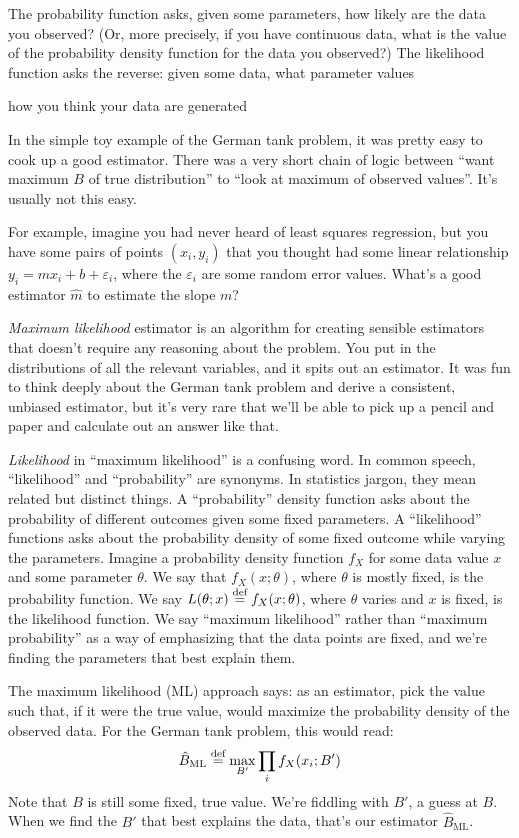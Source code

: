 The probability function asks, given some parameters, how
likely are the data you observed? (Or, more precisely, if you have continuous data,
what is the value of the probability density function for the data you observed?)
The likelihood function asks the reverse: given some data, what parameter values


how you think your
data are generated

In the simple toy example of the German tank problem, it was pretty easy to
cook up a good estimator. There was a very short chain of logic between ``want
maximum $B$ of true distribution'' to ``look at maximum of observed values''.
It's usually not this easy.

For example, imagine you had never heard of least squares regression, but you
have some pairs of points $(x_i, y_i)$ that you thought had some linear
relationship $y_i = m x_i + b + \varepsilon_i$, where the $\varepsilon_i$ are
some random error values. What's a good estimator $\hat{m}$ to estimate the
slope $m$?

\emph{Maximum likelihood} estimator is an algorithm for creating sensible
estimators that doesn't require any reasoning about the problem. You put in
the distributions of all the relevant variables, and it spits out an
estimator. It was fun to think deeply about the German tank problem and
derive a consistent, unbiased estimator, but it's very rare that we'll be
able to pick up a pencil and paper and calculate out an answer like that.

\emph{Likelihood} in ``maximum likelihood'' is a confusing word. In common
speech, ``likelihood'' and ``probability'' are synonyms. In statistics jargon,
they mean related but distinct things. A ``probability'' density function asks
about the probability of different outcomes given some fixed parameters. A
``likelihood'' functions asks about the probability density of some fixed
outcome while varying the parameters. Imagine a probability density function
$f_X$ for some data value $x$ and some parameter $\theta$. We say that $f_X(x;
\theta)$, where $\theta$ is mostly fixed, is the probability function. We say
$L(\theta; x) \stackrel{\text{def}}{=} f_X(x; \theta)$, where $\theta$ varies and $x$ is fixed,
is the likelihood function. We say ``maximum likelihood'' rather than
``maximum probability'' as a way of emphasizing that the data points are
fixed, and we're finding the parameters that best explain them.

The maximum likelihood (ML) approach says: as an estimator, pick the value
such that, if it were the true value, would maximize the probability density
of the observed data. For the German tank problem, this would read:
\begin{equation}
\hat{B}_\text{ML} \stackrel{\text{def}}{=} \max_{B'} \prod_i f_X(x_i; B')
\end{equation}
Note that $B$ is still some fixed, true value. We're fiddling with $B'$, a
guess at $B$. When we find the $B'$ that best explains the data, that's our
estimator $\hat{B}_\mathrm{ML}$.

